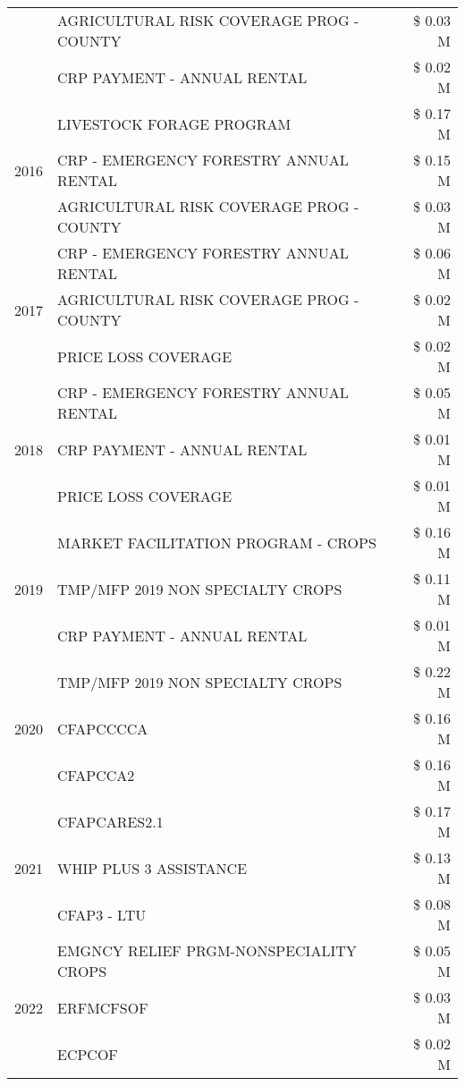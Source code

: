 \begin{tabular}{llr}
 & AGRICULTURAL RISK COVERAGE PROG - COUNTY & \$ 0.03 M \\
 & CRP PAYMENT - ANNUAL RENTAL & \$ 0.02 M \\
\cline{1-3}
\multirow[t]{3}{*}{2016} & LIVESTOCK FORAGE PROGRAM & \$ 0.17 M \\
 & CRP - EMERGENCY FORESTRY ANNUAL RENTAL & \$ 0.15 M \\
 & AGRICULTURAL RISK COVERAGE PROG - COUNTY & \$ 0.03 M \\
\cline{1-3}
\multirow[t]{3}{*}{2017} & CRP - EMERGENCY FORESTRY ANNUAL RENTAL & \$ 0.06 M \\
 & AGRICULTURAL RISK COVERAGE PROG - COUNTY & \$ 0.02 M \\
 & PRICE LOSS COVERAGE & \$ 0.02 M \\
\cline{1-3}
\multirow[t]{3}{*}{2018} & CRP - EMERGENCY FORESTRY ANNUAL RENTAL & \$ 0.05 M \\
 & CRP PAYMENT - ANNUAL RENTAL & \$ 0.01 M \\
 & PRICE LOSS COVERAGE & \$ 0.01 M \\
\cline{1-3}
\multirow[t]{3}{*}{2019} & MARKET FACILITATION PROGRAM - CROPS & \$ 0.16 M \\
 & TMP/MFP 2019 NON SPECIALTY CROPS & \$ 0.11 M \\
 & CRP PAYMENT - ANNUAL RENTAL & \$ 0.01 M \\
\cline{1-3}
\multirow[t]{3}{*}{2020} & TMP/MFP 2019 NON SPECIALTY CROPS & \$ 0.22 M \\
 & CFAPCCCCA & \$ 0.16 M \\
 & CFAPCCA2 & \$ 0.16 M \\
\cline{1-3}
\multirow[t]{3}{*}{2021} & CFAPCARES2.1 & \$ 0.17 M \\
 & WHIP PLUS 3 ASSISTANCE & \$ 0.13 M \\
 & CFAP3 - LTU & \$ 0.08 M \\
\cline{1-3}
\multirow[t]{3}{*}{2022} & EMGNCY RELIEF PRGM-NONSPECIALITY CROPS & \$ 0.05 M \\
 & ERFMCFSOF & \$ 0.03 M \\
 & ECPCOF & \$ 0.02 M \\
\cline{1-3}
\bottomrule
\end{tabular}
